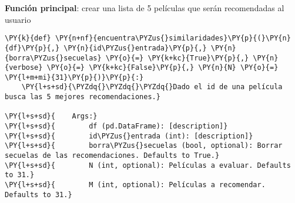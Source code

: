     \textbf{Función principal}: crear una lista de 5 películas que serán
recomendadas al usuario

    \begin{tcolorbox}[breakable, size=fbox, boxrule=1pt, pad at break*=1mm,colback=cellbackground, colframe=cellborder]
\begin{Verbatim}[commandchars=\\\{\}]
\PY{k}{def} \PY{n+nf}{encuentra\PYZus{}similaridades}\PY{p}{(}\PY{n}{df}\PY{p}{,} \PY{n}{id\PYZus{}entrada}\PY{p}{,} \PY{n}{borra\PYZus{}secuelas} \PY{o}{=} \PY{k+kc}{True}\PY{p}{,} \PY{n}{verbose} \PY{o}{=} \PY{k+kc}{False}\PY{p}{,} \PY{n}{N} \PY{o}{=} \PY{l+m+mi}{31}\PY{p}{)}\PY{p}{:}
    \PY{l+s+sd}{\PYZdq{}\PYZdq{}\PYZdq{}Dado el id de una película busca las 5 mejores recomendaciones.}

\PY{l+s+sd}{    Args:}
\PY{l+s+sd}{        df (pd.DataFrame): [description]}
\PY{l+s+sd}{        id\PYZus{}entrada (int): [description]}
\PY{l+s+sd}{        borra\PYZus{}secuelas (bool, optional): Borrar secuelas de las recomendaciones. Defaults to True.}
\PY{l+s+sd}{        N (int, optional): Películas a evaluar. Defaults to 31.}
\PY{l+s+sd}{        M (int, optional): Películas a recomendar. Defaults to 31.}


\end{Verbatim}
\end{tcolorbox}
